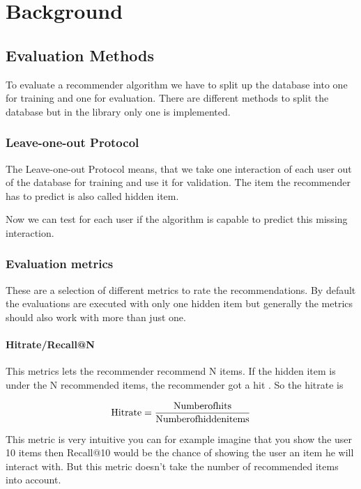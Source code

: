 
\chapter{Background}


\section{Evaluation Methods}

To evaluate a recommender algorithm we have to split up the database
into one for training and one for evaluation. There are different
methods to split the database but in the library only one is implemented.


\subsection{Leave-one-out Protocol}

The Leave-one-out Protocol means, that we take one interaction of
each user out of the database for training and use it for validation.
The item the recommender has to predict is also called hidden item. 

Now we can test for each user if the algorithm is capable to predict
this missing interaction.


\subsection{Evaluation metrics}

These are a selection of different metrics to rate the recommendations.
By default the evaluations are executed with only one hidden item
but generally the metrics should also work with more than just one.


\subsubsection{Hitrate/Recall@N}

This metrics lets the recommender recommend N items. If the hidden
item is under the N recommended items, the recommender got a hit \cite{Karypis:2001:EIT:502585.502627, Sarwar00applicationof}.
So the hitrate is 

\[
\mathrm{\textrm{Hitrate}}=\frac{\textrm{\ensuremath{\mathrm{Number}}ofhits}}{\textrm{Numberofhiddenitems}}
\]


This metric is very intuitive you can for example imagine that you
show the user 10 items then Recall@10 would be the chance of showing
the user an item he will interact with. But this metric doesn't take
the number of recommended items into account.


